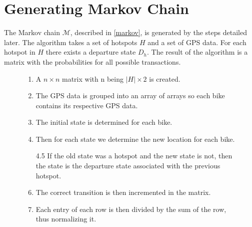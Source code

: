 \section{Generating Markov Chain}\label{sec:generatemarkov}
The Markov chain $\mathcal{M}$, described in \cref{markov}, is generated by the steps detailed later.
The algorithm takes a set of hotspots $H$ and a set of GPS data. For each hotspot in $H$ there exists a departure state $D_h$.
The result of the algorithm is a matrix with the probabilities for all possible transactions.

\begin{figure}
\begin{enumerate}
\item A $n \times n$ matrix with n being $|H| \times 2$ is created.
\item The GPS data is grouped into an array of arrays so each bike contains its respective GPS data.
\item The initial state is determined for each bike.
\item Then for each state we determine the new location for each bike.
\item[4.5] If the old state was a hotspot and the new state is not, then the state is the departure state associated with the previous hotspot.
\item The correct transition is then incremented in the matrix.
\item Each entry of each row is then divided by the sum of the row, thus normalizing it.
\end{enumerate}
\label{enum:markov}
\end{figure}